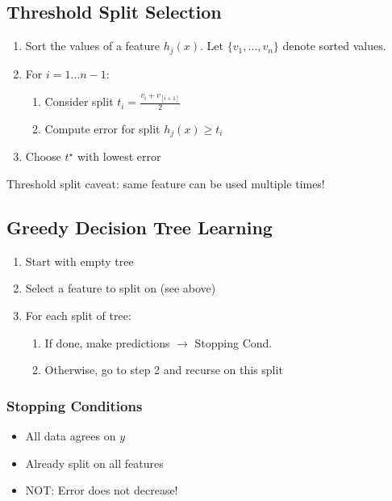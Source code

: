 \documentclass[8pt, a4paper, landscape, includeheadfoot]{extarticle}
\begin{document}
\begin{multicols*}{4}
	\subsection{Threshold Split Selection}
	\begin{enumerate}[itemsep=0pt]
		\item Sort the values of a feature $h_j(x)$. Let $\{v_1, \dots, v_n\}$ denote sorted values.
		\item For $i = 1\dots n-1$:
		      \begin{enumerate}[itemsep=0pt]
			      \item Consider split $t_i = \frac{v_i + v_[i+1]}{2}$
			      \item Compute error for split $h_j(x)\geq t_i$
		      \end{enumerate}
		\item Choose $t^\star$ with lowest error
	\end{enumerate}
	Threshold split caveat: same feature can be used multiple times!

	\subsection{Greedy Decision Tree Learning}
	\begin{enumerate}[itemsep=0pt]
		\item Start with empty tree
		\item Select a feature to split on (see above)
		\item For each split of tree:
		      \begin{enumerate}[itemsep=0pt]
			      \item If done, make predictions $\rightarrow$ Stopping Cond.
			      \item Otherwise, go to step 2 and recurse on this split
		      \end{enumerate}
	\end{enumerate}

	\subsubsection{Stopping Conditions}{}
	\begin{itemize}[itemsep=0pt]
		\item All data agrees on $y$
		\item Already split on all features
		\item NOT: Error does not decrease!
	\end{itemize}


\end{multicols*}
\end{document}
